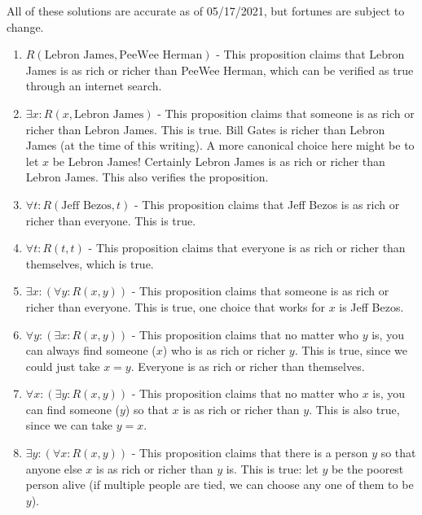 \begin{solutions}
	
	All of these solutions are accurate as of 05/17/2021, but fortunes are subject to change.
	\begin{enumerate}
		\item $R(\textrm{Lebron James}, \textrm{PeeWee Herman})$ - This proposition claims that Lebron James is as rich or richer than PeeWee Herman, which can be verified as true through an internet search.
		\item $\exists x: R(x,\textrm{Lebron James})$ - This proposition claims that someone is as rich or richer than Lebron James.  This is true.  Bill Gates is richer than Lebron James (at the time of this writing).  A more canonical choice here might be to let $x$ be Lebron James!  Certainly Lebron James is as rich or richer than Lebron James.  This also verifies the proposition.
		\item $\forall t: R(\textrm{Jeff Bezos}, t )$ - This proposition claims that Jeff Bezos is as rich or richer than everyone.  This is true.
		\item $\forall t: R(t,t)$ -  This proposition claims that everyone is as rich or richer than themselves, which is true.
		\item $\exists x: \left( \forall y : R(x,y)\right)$ - This proposition claims that someone is as rich or richer than everyone.  This is true, one choice that works for $x$ is Jeff Bezos.
		\item $\forall y : \left( \exists x : R(x,y)\right)$  - This proposition claims that no matter who $y$ is, you can always find someone ($x$) who is as rich or richer $y$.  This is true, since we could just take $x = y$.  Everyone is as rich or richer than themselves.
		\item $\forall x : \left( \exists y : R(x,y)\right)$ - This proposition claims that no matter who $x$ is, you can find someone ($y$) so that $x$ is as rich or richer than $y$.  This is also true, since we can take $y = x$.
		\item $\exists y : \left( \forall  x : R(x,y)\right)$ - This proposition claims that there is a person $y$ so that anyone else $x$ is as rich or richer than $y$ is.  This is true:  let $y$ be the poorest person alive (if multiple people are tied, we can choose any one of them to be $y$).
	\end{enumerate}
	\end{solutions}


